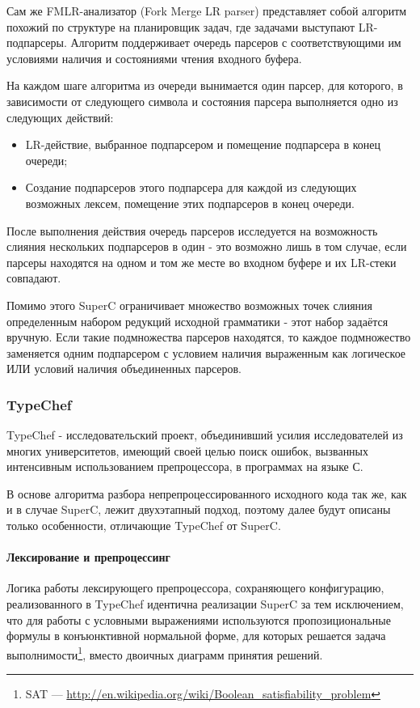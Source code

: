 Сам же FMLR-анализатор (Fork Merge LR parser) представляет собой алгоритм похожий по структуре на планировщик задач, где задачами выступают LR-подпарсеры. Алгоритм поддерживает очередь парсеров с соответствующими им условиями наличия и состояниями чтения входного буфера.

На каждом шаге алгоритма из очереди вынимается один парсер, для которого, в зависимости от следующего символа и состояния парсера выполняется одно из следующих действий:

\begin{itemize}
\item LR-действие, выбранное подпарсером и помещение подпарсера в конец очереди;
\item Создание подпарсеров этого подпарсера для каждой из следующих возможных лексем, помещение этих подпарсеров в конец очереди.
\end{itemize}

После выполнения действия очередь парсеров исследуется на возможность слияния нескольких подпарсеров в один - это возможно лишь в том случае, если парсеры находятся на одном и том же месте во входном буфере и их LR-стеки совпадают. 

Помимо этого SuperC ограничивает множество возможных точек слияния определенным набором редукций исходной грамматики - этот набор задаётся вручную. Если такие подмножества парсеров находятся, то каждое подмножество заменяется одним подпарсером с условием наличия выраженным как логическое ИЛИ условий наличия объединенных парсеров.

\subsubsection{TypeChef}

TypeChef - исследовательский проект, объединивший усилия исследователей из многих университетов, имеющий своей целью поиск ошибок, вызванных интенсивным использованием препроцессора, в программах на языке С.

В основе алгоритма разбора непрепроцессированного исходного кода  так же, как и в случае SuperC, лежит двухэтапный подход, поэтому далее будут описаны только особенности, отличающие TypeChef от SuperC.

\paragraph{Лексирование и препроцессинг}

Логика работы лексирующего препроцессора, сохраняющего конфигурацию, реализованного в TypeChef идентична реализации SuperC за тем исключением, что для работы с условными выражениями используются пропозициональные формулы в конъюнктивной нормальной форме, для которых решается задача выполнимости\footnote{SAT --- \url{http://en.wikipedia.org/wiki/Boolean\_satisfiability\_problem}}, вместо двоичных диаграмм принятия решений. 

